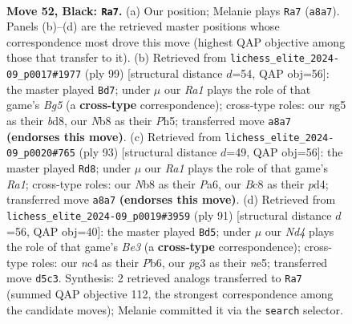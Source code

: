 \documentclass[11pt]{article}
\begin{document}
\clearpage

\begin{figure}[p]\centering
\begin{subfigure}{0.46\textwidth}\centering
\resizebox{\linewidth}{!}{%
\newchessgame
\chessboard[
  setfen={rnb2k2/8/4p3/1P1n1pNB/1pN2P2/1P4P1/6KP/1R6 b - - 4 52},
  showmover=false,
  pgfstyle=straightmove, color=movearrow, markmove={a8-a7}
]}
\caption{}
\end{subfigure}\hfill
\begin{subfigure}{0.46\textwidth}\centering
\resizebox{\linewidth}{!}{%
\newchessgame
\chessboard[
  setfen={3B4/5k2/1p3pp1/1P1p3p/2nN2bP/4P1P1/5P2/6K1 b - - 3 50},
  showmover=false,
  pgfstyle=straightmove, color=movearrow, markmove={g4-d7}
]}
\caption{}
\end{subfigure}
\\[4pt]
\begin{subfigure}{0.46\textwidth}\centering
\resizebox{\linewidth}{!}{%
\newchessgame
\chessboard[
  setfen={r7/6k1/p1p5/4Np2/1p1PbPp1/6P1/PPP4R/2K5 b - - 3 47},
  showmover=false,
  pgfstyle=straightmove, color=movearrow, markmove={a8-d8}
]}
\caption{}
\end{subfigure}\hfill
\begin{subfigure}{0.46\textwidth}\centering
\resizebox{\linewidth}{!}{%
\newchessgame
\chessboard[
  setfen={1k2r3/p5p1/Pp1nb3/1P2N3/3P1KPp/3B3P/8/2R5 b - - 9 46},
  showmover=false,
  pgfstyle=straightmove, color=movearrow, markmove={e6-d5}
]}
\caption{}
\end{subfigure}
\caption{\textbf{Move 52, Black: \texttt{Ra7}.} (a) Our position; Melanie plays \texttt{Ra7} (\texttt{a8a7}). Panels (b)--(d) are the retrieved master positions whose correspondence most drove this move (highest QAP objective among those that transfer to it). (b) Retrieved from \texttt{lichess\_elite\_2024-09\_p0017\#1977} (ply 99) [structural distance $d$=54, QAP obj=56]: the master played \texttt{Bd7}; under $\mu$ our \emph{Ra1} plays the role of that game's \emph{Bg5} (a \textbf{cross-type} correspondence); cross-type roles: our \emph{n}g5 as their \emph{b}d8, our \emph{N}b8 as their \emph{P}h5; transferred move \texttt{a8a7} \textbf{(endorses this move)}. (c) Retrieved from \texttt{lichess\_elite\_2024-09\_p0020\#765} (ply 93) [structural distance $d$=49, QAP obj=56]: the master played \texttt{Rd8}; under $\mu$ our \emph{Ra1} plays the role of that game's \emph{Ra1}; cross-type roles: our \emph{N}b8 as their \emph{P}a6, our \emph{B}c8 as their \emph{p}d4; transferred move \texttt{a8a7} \textbf{(endorses this move)}. (d) Retrieved from \texttt{lichess\_elite\_2024-09\_p0019\#3959} (ply 91) [structural distance $d$=56, QAP obj=40]: the master played \texttt{Bd5}; under $\mu$ our \emph{Nd4} plays the role of that game's \emph{Be3} (a \textbf{cross-type} correspondence); cross-type roles: our \emph{n}c4 as their \emph{P}b6, our \emph{p}g3 as their \emph{n}e5; transferred move \texttt{d5c3}. Synthesis: 2 retrieved analogs transferred to \texttt{Ra7} (summed QAP objective 112, the strongest correspondence among the candidate moves); Melanie committed it via the \texttt{search} selector.}
\label{fig:thought-m103}
\end{figure}
\end{document}
